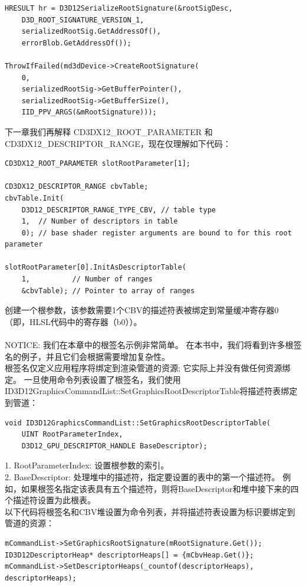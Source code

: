 \documentclass[11pt,a4paper,oldfontcommands]{memoir}
\begin{document}
{\begin{flushleft}
\begin{lstlisting}
HRESULT hr = D3D12SerializeRootSignature(&rootSigDesc, 
    D3D_ROOT_SIGNATURE_VERSION_1,
    serializedRootSig.GetAddressOf(),
    errorBlob.GetAddressOf());

ThrowIfFailed(md3dDevice->CreateRootSignature(
    0,
    serializedRootSig->GetBufferPointer(),
    serializedRootSig->GetBufferSize(),
    IID_PPV_ARGS(&mRootSignature)));
\end{lstlisting}
下一章我们再解释 CD3DX12\_ROOT\_PARAMETER 和 CD3DX12\_DESCRIPTOR\_RANGE，现在仅理解如下代码：\\
\begin{lstlisting}
CD3DX12_ROOT_PARAMETER slotRootParameter[1];

CD3DX12_DESCRIPTOR_RANGE cbvTable;
cbvTable.Init(
    D3D12_DESCRIPTOR_RANGE_TYPE_CBV, // table type
    1,  // Number of descriptors in table
    0); // base shader register arguments are bound to for this root parameter

slotRootParameter[0].InitAsDescriptorTable(
    1,          // Number of ranges
    &cbvTable); // Pointer to array of ranges
\end{lstlisting}
创建一个根参数，该参数需要1个CBV的描述符表被绑定到常量缓冲寄存器0（即，HLSL代码中的寄存器（b0））。\\
~\\
NOTICE: 我们在本章中的根签名示例非常简单。 在本书中，我们将看到许多根签名的例子，并且它们会根据需要增加复杂性。
~\\
根签名仅定义应用程序将绑定到渲染管道的资源; 它实际上并没有做任何资源绑定。 一旦使用命令列表设置了根签名，我们使用ID3D12GraphicsCommandList::SetGraphicsRootDescriptorTable将描述符表绑定到管道：\\
\begin{lstlisting}
void ID3D12GraphicsCommandList::SetGraphicsRootDescriptorTable(
    UINT RootParameterIndex,
    D3D12_GPU_DESCRIPTOR_HANDLE BaseDescriptor);
\end{lstlisting}
1. RootParameterIndex: 设置根参数的索引。\\
2. BaseDescriptor: 处理堆中的描述符，指定要设置的表中的第一个描述符。 例如，如果根签名指定该表具有五个描述符，则将BaseDescriptor和堆中接下来的四个描述符设置为此根表。\\
以下代码将根签名和CBV堆设置为命令列表，并将描述符表设置为标识要绑定到管道的资源：\\
\begin{lstlisting}
mCommandList->SetGraphicsRootSignature(mRootSignature.Get());
ID3D12DescriptorHeap* descriptorHeaps[] = {mCbvHeap.Get()};
mCommandList->SetDescriptorHeaps(_countof(descriptorHeaps), descriptorHeaps);


\end{lstlisting}
\end{flushleft}}
\end{document}
